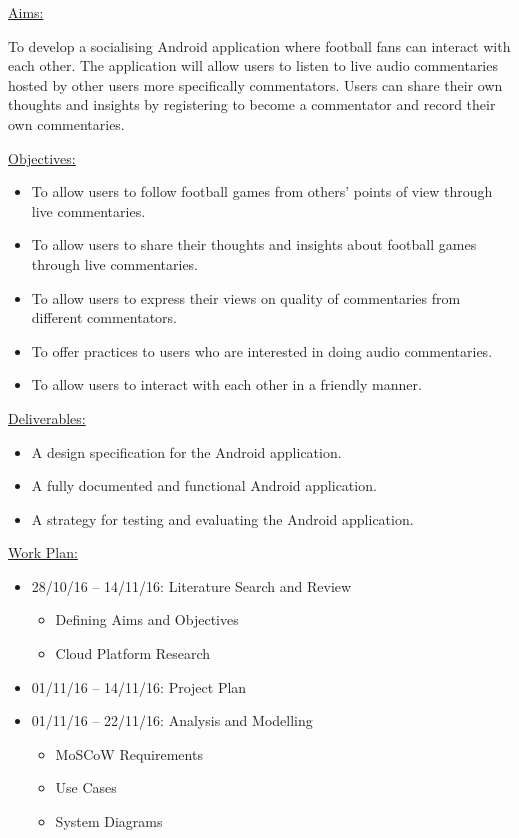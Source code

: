 \documentclass{article}
\begin{document}
\begin{flushleft}
{\Large \underline{Aims:}}\par
To develop a socialising Android application where football fans can interact with each other. The application will allow users to listen to live audio commentaries hosted by other users more specifically commentators. Users can share their own thoughts and insights by registering to become a commentator and record their own commentaries.\par
{\Large \underline{Objectives:}}
\begin{itemize}
	\item To allow users to follow football games from others’ points of view through live commentaries.
	\item To allow users to share their thoughts and insights about football games through live commentaries.
	\item To allow users to express their views on quality of commentaries from different commentators.
	\item To offer practices to users who are interested in doing audio commentaries.
	\item To allow users to interact with each other in a friendly manner.
\end{itemize}
{\Large \underline{Deliverables:}}
\begin{itemize}
	\item A design specification for the Android application.
	\item A fully documented and functional Android application.
	\item A strategy for testing and evaluating the Android application.
\end{itemize}
{\Large \underline{Work Plan:}}
\begin{itemize}
	\item 28/10/16 – 14/11/16: Literature Search and Review
	\begin{itemize}
		\item Defining Aims and Objectives 
		\item Cloud Platform Research 
	\end{itemize}
	\item 01/11/16 – 14/11/16: Project Plan
	\item 01/11/16 – 22/11/16: Analysis and Modelling
	\begin{itemize}
		\item MoSCoW Requirements 
		\item Use Cases 
		\item System Diagrams

\end{itemize}
\end{itemize}
\end{flushleft}
\end{document}
